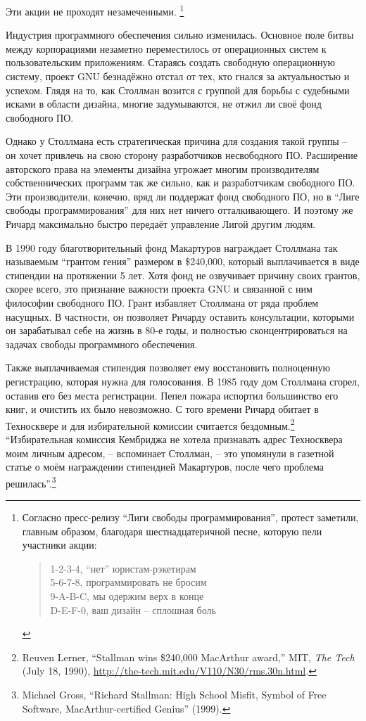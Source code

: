 Эти акции не проходят незамеченными. \footnote{Согласно пресс-релизу \enquote{Лиги свободы программирования}, протест заметили, главным образом, благодаря шестнадцатеричной песне, которую пели участники акции:

\begin{verse}
1-2-3-4, \enquote{нет} юристам-рэкетирам\\
5-6-7-8, программировать не бросим\\
9-A-B-C, мы одержим верх в конце\\
D-E-F-0, ваш дизайн -- сплошная боль\\
\end{verse}}

Индустрия программного обеспечения сильно изменилась. Основное поле битвы между корпорациями незаметно переместилось от операционных систем к пользовательским приложениям. Стараясь создать свободную операционную систему, проект GNU безнадёжно отстал от тех, кто гнался за актуальностью и успехом. Глядя на то, как Столлман возится с группой для борьбы с судебными исками в области дизайна, многие задумываются, не отжил ли своё фонд свободного ПО.

Однако у Столлмана есть стратегическая причина для создания такой группы -- он хочет привлечь на свою сторону разработчиков несвободного ПО. Расширение авторского права на элементы дизайна угрожает многим производителям собственнических программ так же сильно, как и разработчикам свободного ПО. Эти производители, конечно, вряд ли поддержат фонд свободного ПО, но в \enquote{Лиге свободы программирования} для них нет ничего отталкивающего. И поэтому же Ричард максимально быстро передаёт управление Лигой другим людям.

В 1990 году благотворительный фонд Макартуров награждает Столлмана так называемым \enquote{грантом гения} размером в \$240,000, который выплачивается в виде стипендии на протяжении 5 лет. Хотя фонд не озвучивает причину своих грантов, скорее всего, это признание важности проекта GNU и связанной с ним философии свободного ПО. Грант избавляет Столлмана от ряда проблем насущных. В частности, он позволяет Ричарду оставить консультации, которыми он зарабатывал себе на жизнь в 80-е годы, и полностью сконцентрироваться на задачах свободы программного обеспечения.

Также выплачиваемая стипендия позволяет ему восстановить полноценную регистрацию, которая нужна для голосования. В 1985 году дом Столлмана сгорел, оставив его без места регистрации. Пепел пожара испортил большинство его книг, и очистить их было невозможно. С того времени Ричард обитает в Техносквере и для избирательной комиссии считается бездомным.\footnote{Reuven Lerner, \enquote{Stallman wins \$240,000 MacArthur award,} MIT, \textit{The Tech} (July 18, 1990), \url{http://the-tech.mit.edu/V110/N30/rms.30n.html}.} \enquote{Избирательная комиссия Кембриджа не хотела признавать адрес Техносквера моим личным адресом, -- вспоминает Столлман, -- это упомянули в газетной статье о моём награждении стипендией Макартуров, после чего проблема решилась}.\footnote{Michael Gross, \enquote{Richard Stallman: High School Misfit, Symbol of Free Software, MacArthur-certified Genius} (1999).}

